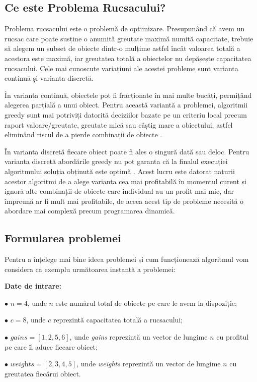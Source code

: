 \begin{sloppypar}
\subsection*{Ce este Problema Rucsacului?}
Problema rucsacului este o problemă de optimizare. Presupunând că avem un rucsac care poate susține o anumită greutate maximă numită capacitate, trebuie să alegem un subset de obiecte dintr-o mulțime astfel încât valoarea totală a acestora este maximă, iar greutatea totală a obiectelor nu depășește capacitatea rucsacului. Cele mai cunoscute variațiuni ale acestei probleme sunt varianta continuă și varianta discretă. \par 
În varianta continuă, obiectele pot fi fracționate în mai multe bucăți, permițând alegerea parțială a unui obiect. Pentru această variantă a problemei, algoritmii greedy sunt mai potriviți datorită deciziilor bazate pe un criteriu local precum raport valoare/greutate, greutate mică sau câștig mare a obiectului, astfel eliminând riscul de a pierde combinații de obiecte \cite{Algorithm-Design}. \par
În varianta discretă fiecare obiect poate fi ales o singură dată sau deloc. Pentru varianta discretă abordările greedy nu pot garanta că la finalul execuției algoritmului soluția obținută este optimă \cite{Algorithm-Design}. Acest lucru este datorat naturii acestor algoritmi de a alege varianta cea mai profitabilă în momentul curent și ignoră alte combinații de obiecte care individual au un profit mai mic, dar împreună ar fi mult mai profitabile, de aceea acest tip de probleme necesită o abordare mai complexă precum programarea dinamică. \\

\subsection*{Formularea problemei}
Pentru a înțelege mai bine ideea problemei și cum funcționează algoritmul vom considera ca exemplu următoarea instanță a problemei:
\begin{textbox}
\textbf{Date de intrare:} \par
$\bullet$ $n = 4$, unde $n$ este numărul total de obiecte pe care le avem la dispoziție; \par
$\bullet$ $c = 8$, unde $c$ reprezintă capacitatea totală a rucsacului; \par
$\bullet$ $\textit{gains} = [1, 2, 5, 6]$, unde \textit{gains} reprezintă un vector de lungime $n$ cu profitul pe care îl aduce fiecare obiect; \par
$\bullet$ $\textit{weights} = [2, 3, 4, 5]$, unde \textit{weights} reprezintă un vector de lungime $n$ cu greutatea fiecărui obiect.
\end{textbox}


\end{sloppypar}
